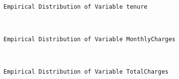 \documentclass[8pt,onecolumn,aps,pra]{revtex4-1}
\begin{document}
    \begin{Verbatim}[commandchars=\\\{\}]
Empirical Distribution of Variable tenure

    \end{Verbatim}

    \begin{center}
    \end{center}
    { \hspace*{\fill} \\}
    
    \begin{Verbatim}[commandchars=\\\{\}]
Empirical Distribution of Variable MonthlyCharges

    \end{Verbatim}

    \begin{center}
    \end{center}
    { \hspace*{\fill} \\}
    
    \begin{Verbatim}[commandchars=\\\{\}]
Empirical Distribution of Variable TotalCharges

    \end{Verbatim}

    \begin{center}
    \end{center}
    { \hspace*{\fill} \\}
    
\end{document}
